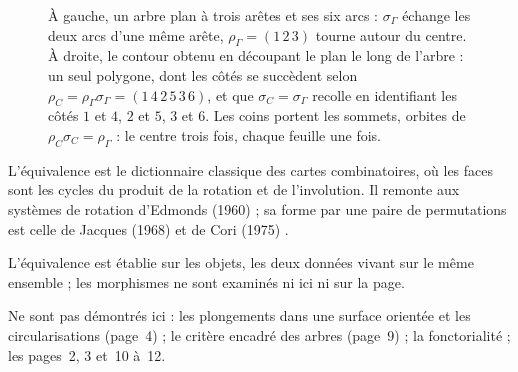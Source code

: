 \begin{figure}[htbp]
\centering
{}
\caption{À gauche, un arbre plan à trois arêtes et ses six arcs : $\sigma_\Gamma$ échange les deux arcs d'une même arête, $\rho_\Gamma = (1\,2\,3)$ tourne autour du centre. À droite, le contour obtenu en découpant le plan le long de l'arbre : un seul polygone, dont les côtés se succèdent selon $\rho_C = \rho_\Gamma\sigma_\Gamma = (1\,4\,2\,5\,3\,6)$, et que $\sigma_C = \sigma_\Gamma$ recolle en identifiant les côtés $1$ et $4$, $2$ et $5$, $3$ et $6$. Les coins portent les sommets, orbites de $\rho_C\sigma_C = \rho_\Gamma$ : le centre trois fois, chaque feuille une fois.}
\label{fig:152-arbre}
\end{figure}

\begin{remarque}
L'équivalence est le dictionnaire classique des cartes combinatoires, où les faces sont les cycles du produit de la rotation et de l'involution. Il remonte aux systèmes de rotation d'Edmonds (1960) ; sa forme par une paire de permutations est celle de Jacques (1968) \cite{jacques1968} et de Cori (1975) \cite{cori1975}.
\end{remarque}

\begin{remarque}
L'équivalence est établie sur les objets, les deux données vivant sur le même ensemble ; les morphismes ne sont examinés ni ici ni sur la page.
\end{remarque}

Ne sont pas démontrés ici : les plongements dans une surface orientée et les circularisations (page~4) ; le critère encadré des arbres (page~9) ; la fonctorialité ; les pages~2, 3 et~10 à~12.
